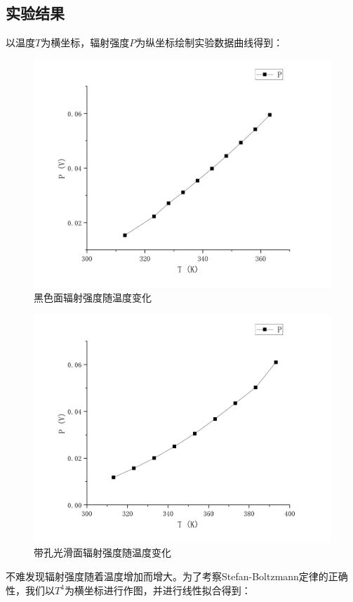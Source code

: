 \documentclass{WHUReport}
\begin{document}
\begin{multicols}{2}
	\subsection{实验结果}
	以温度$T$为横坐标，辐射强度$P$为纵坐标绘制实验数据曲线得到：
	\begin{figure}[H]
		\centering
		\includegraphics[width=\linewidth]{figs/black.pdf}
		\caption{黑色面辐射强度随温度变化}
	\end{figure}
	\begin{figure}[H]
		\centering
		\includegraphics[width=\linewidth]{figs/hole.pdf}
		\caption{带孔光滑面辐射强度随温度变化}
	\end{figure}
	不难发现辐射强度随着温度增加而增大。为了考察Stefan-Boltzmann定律的正确性，我们以$T^4$为横坐标进行作图，并进行线性拟合得到：

\end{multicols}
\end{document}
